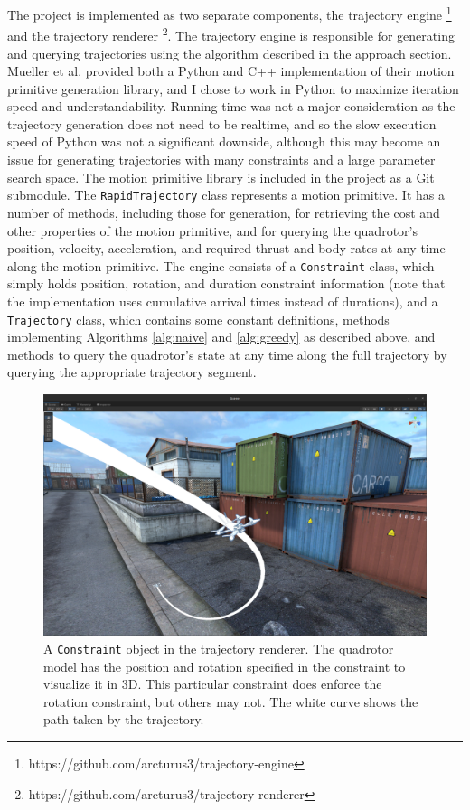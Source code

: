 \documentclass[pageno]{jpaper}
\begin{document}
The project is implemented as two separate components, the trajectory engine \footnote{https://github.com/arcturus3/trajectory-engine} and the trajectory renderer \footnote{https://github.com/arcturus3/trajectory-renderer}. The trajectory engine is responsible for generating and querying trajectories using the algorithm described in the approach section. Mueller et al. provided both a Python and C++ implementation of their motion primitive generation library, and I chose to work in Python to maximize iteration speed and understandability. Running time was not a major consideration as the trajectory generation does not need to be realtime, and so the slow execution speed of Python was not a significant downside, although this may become an issue for generating trajectories with many constraints and a large parameter search space. The motion primitive library is included in the project as a Git submodule. The \texttt{RapidTrajectory} class represents a motion primitive. It has a number of methods, including those for generation, for retrieving the cost and other properties of the motion primitive, and for querying the quadrotor's position, velocity, acceleration, and required thrust and body rates at any time along the motion primitive. The engine consists of a \texttt{Constraint} class, which simply holds position, rotation, and duration constraint information (note that the implementation uses cumulative arrival times instead of durations), and a \texttt{Trajectory} class, which contains some constant definitions, methods implementing Algorithms \ref{alg:naive} and \ref{alg:greedy} as described above, and methods to query the quadrotor's state at any time along the full trajectory by querying the appropriate trajectory segment.

\begin{figure}
  \includegraphics[width=\linewidth]{data/constraint.png}
  \caption{A \texttt{Constraint} object in the trajectory renderer. The quadrotor model has the position and rotation specified in the constraint to visualize it in 3D. This particular constraint does enforce the rotation constraint, but others may not. The white curve shows the path taken by the trajectory.}
  \label{fig:constraint}
\end{figure}
\end{document}

